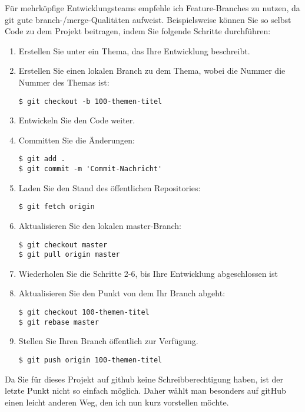 Für mehrköpfige Entwicklungsteams empfehle ich Feature-Branches zu nutzen, da \gls{git} gute branch-/merge-Qualitäten aufweist. Beispielsweise können Sie so selbst Code zu dem Projekt beitragen, indem Sie folgende Schritte durchführen:
\begin{enumerate}
\item Erstellen Sie unter  ein Thema, das Ihre Entwicklung beschreibt.

\item Erstellen Sie einen lokalen Branch zu dem Thema, wobei die Nummer die Nummer des Themas ist:
\begin{verbatim}
$ git checkout -b 100-themen-titel
\end{verbatim}

\item Entwickeln Sie den Code weiter.

\item Committen Sie die Änderungen:
\begin{verbatim}
$ git add .
$ git commit -m 'Commit-Nachricht'
\end{verbatim}

\item Laden Sie den Stand des öffentlichen Repositories:
\begin{verbatim}
$ git fetch origin
\end{verbatim}

\item Aktualisieren Sie den lokalen master-Branch:
\begin{verbatim}
$ git checkout master
$ git pull origin master
\end{verbatim}

\item Wiederholen Sie die Schritte 2-6, bis Ihre Entwicklung abgeschlossen ist

\item Aktualisieren Sie den Punkt von dem Ihr Branch abgeht:
\begin{verbatim}
$ git checkout 100-themen-titel
$ git rebase master
\end{verbatim}

\item Stellen Sie Ihren Branch öffentlich zur Verfügung.
\begin{verbatim}
$ git push origin 100-themen-titel
\end{verbatim}
\end{enumerate}

Da Sie für dieses Projekt auf github keine Schreibberechtigung haben, ist der letzte Punkt nicht so einfach möglich. Daher wählt man besonders auf gitHub einen leicht anderen Weg, den ich nun kurz vorstellen möchte.

